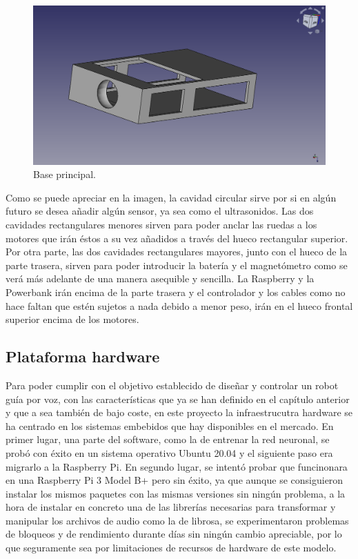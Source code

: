\begin{figure}[H]
  \centering
  \includegraphics[scale=0.25]{figs/base} %
  \caption{Base principal.}
  \label{fig:Base_principal}
\end{figure}

Como se puede apreciar en la imagen, la cavidad circular sirve por si en algún futuro se desea añadir algún sensor, ya sea como el ultrasonidos. Las dos cavidades rectangulares menores sirven para poder anclar las ruedas a los motores que irán éstos a su vez añadidos a través del hueco rectangular superior. Por otra parte, las dos cavidades rectangulares mayores, junto con el hueco de la parte trasera, sirven para poder introducir la batería y el magnetómetro como se verá más adelante de una manera asequible y sencilla. La Raspberry y la Powerbank irán encima de la parte trasera y el controlador y los cables como no hace faltan que estén sujetos a nada debido a menor peso, irán en el hueco frontal superior encima de los motores.


\subsection{Plataforma hardware}
\label{subsec:plataforma_hardware}


Para poder cumplir con el objetivo establecido de diseñar y controlar un robot guía por voz, con las características que ya se han definido en el capítulo anterior y que a sea también de bajo coste, en este proyecto la infraestrucutra hardware se ha centrado en los sistemas embebidos que hay disponibles en el mercado. En primer lugar, una parte del software, como la de entrenar la red neuronal, se probó con éxito en un sistema operativo Ubuntu 20.04 y el siguiente paso era migrarlo a la Raspberry Pi. En segundo lugar, se intentó probar que funcinonara en una Raspberry Pi 3 Model B+ pero sin éxito, ya que aunque se consiguieron instalar los mismos paquetes con las mismas versiones sin ningún problema, a la hora de instalar en concreto una de las librerías necesarias para transformar y manipular los archivos de audio como la de librosa, se experimentaron problemas de bloqueos y de rendimiento durante días sin ningún cambio apreciable, por lo que seguramente sea por limitaciones de recursos de hardware de este modelo.\\

